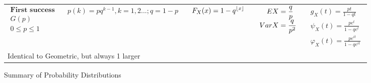 \documentclass{article}
\DeclarePairedDelimiter\floor{\lfloor}{\rfloor}
\begin{document}
\begin{landscape}
\begin{table}[ht]
\begin{tabular}{@{}l p{6.5cm} p{4.5cm} p{3.0cm} r@{}}
        $\begin{array}{l}
            \textbf{First success} \\
            G(p) \\
            0 \leq p \leq 1
    \end{array}$ & 
    $\begin{array}{l}
    \displaystyle p(k) = p q^{k-1}, k = 1,2... ; q = 1-p\\
    \end{array}$ & 
    $\begin{array}{l}
        \displaystyle F_X(x) = 1 - q^{\floor{x}}
    \end{array}$ & 
    $\begin{array}{l}
    \displaystyle \hspace{0.36cm}  EX = \frac{q}{p} \\
    \displaystyle VarX = \frac{q}{p^2}
    \end{array}$ & 
    $\begin{array}{r}
    \displaystyle g_X(t) = \frac{pt}{1-qt} \\
    \displaystyle \psi_X(t) = \frac{pe^{t}}{1-qe^{t}} \\
    \displaystyle \varphi_X(t) = \frac{pe^{it}}{1-qe^{it}}
    \end{array}$ \\
    \multicolumn{4}{p{19cm}}{Identical to Geometric, but always 1 larger} \\
        
        \bottomrule
        \end{tabular}
        \end{table}


\begin{table}[ht]
\centering
\caption{Summary of Probability Distributions}
\label{tab:probability_distributions}


\end{table}
\end{landscape}
\end{document}
